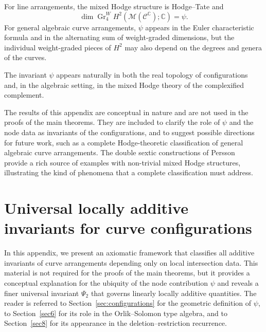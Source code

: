 \documentclass[article,11pt]{amsart} \numberwithin{equation}{section}
\numberwithin{equation}{section}
\begin{document}
{\begin{rk}
		For line arrangements, the mixed Hodge structure is Hodge--Tate and
		\[
		\dim \operatorname{Gr}_4^W H^2(\mathcal M(\mathcal C^\mathbb C);\mathbb C)=\psi.
		\]
		For general algebraic curve arrangements, $\psi$ appears in the Euler
		characteristic formula and in the
		alternating sum of weight-graded dimensions, but the individual
		weight-graded pieces of $H^2$ may also depend on the degrees and genera
		of the curves.
	\end{rk}
	
	\begin{cor}
		\label{cor:real_complex_duality}
		The invariant $\psi$ appears naturally in both the real
		topology of configurations and, in the algebraic setting,
		in the mixed Hodge theory of the complexified complement.
	\end{cor}
	
\begin{rk}
	The results of this appendix are conceptual in nature and are not used
	in the proofs of the main theorems. They are included to clarify the
	role of $\psi$ and the node data as invariants of the configurations,
	and to suggest possible directions for future work, such as a complete
	Hodge-theoretic classification of general algebraic curve arrangements.
	The double sextic constructions of Persson~\cite{Persson1985} provide a
	rich source of examples with non-trivial mixed Hodge structures,
	illustrating the kind of phenomena that a complete classification must
	address.
\end{rk}

\section{Universal locally additive invariants for curve configurations}
\label{app:universal_invariants}

In this appendix, we present an axiomatic framework that classifies all additive invariants of curve arrangements depending only on local intersection data. This material is not required for the proofs of the main theorems, but it provides a conceptual explanation for the ubiquity of the node contribution \(\psi\) and reveals a finer universal invariant \(\Psi_2\) that governs linearly locally additive quantities. The reader is referred to Section~\ref{sec:configurations} for the geometric definition of \(\psi\), to Section~\ref{sec6} for its role in the Orlik--Solomon type algebra, and to Section~\ref{sec8} for its appearance in the deletion--restriction recurrence.

}
\end{document}

